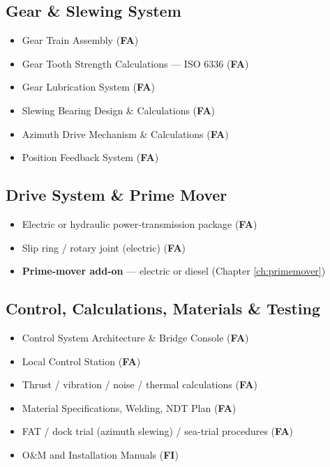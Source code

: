 \documentclass[11pt,a4paper]{report}
\newcommand{\fa}{\textbf{\textcolor{warningred}{FA}}}
\newcommand{\fic}{\textbf{\textcolor{bvgray}{FI}}}
\begin{document}
\subsection{Gear \& Slewing System}
\begin{itemize}[label=$\square$]
\item Gear Train Assembly (\fa{})
\item Gear Tooth Strength Calculations --- ISO 6336 (\fa{})
\item Gear Lubrication System (\fa{})
\item Slewing Bearing Design \& Calculations (\fa{})
\item Azimuth Drive Mechanism \& Calculations (\fa{})
\item Position Feedback System (\fa{})
\end{itemize}

\subsection{Drive System \& Prime Mover}
\begin{itemize}[label=$\square$]
\item Electric or hydraulic power-transmission package (\fa{})
\item Slip ring / rotary joint (electric) (\fa{})
\item \textbf{Prime-mover add-on} --- electric or diesel (Chapter \ref{ch:primemover})
\end{itemize}

\subsection{Control, Calculations, Materials \& Testing}
\begin{itemize}[label=$\square$]
\item Control System Architecture \& Bridge Console (\fa{})
\item Local Control Station (\fa{})
\item Thrust / vibration / noise / thermal calculations (\fa{})
\item Material Specifications, Welding, NDT Plan (\fa{})
\item FAT / dock trial (azimuth slewing) / sea-trial procedures (\fa{})
\item O\&M and Installation Manuals (\fic{})
\end{itemize}
\end{document}
